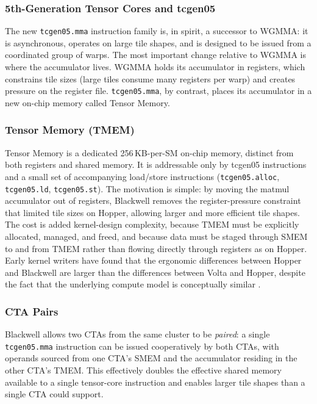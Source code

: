 \documentclass[10pt]{article}
\begin{document}
\subsubsection{5th-Generation Tensor Cores and tcgen05}
The new \texttt{tcgen05.mma} instruction family is, in spirit, a successor to WGMMA: it is asynchronous, operates on large tile shapes, and is designed to be issued from a coordinated group of warps. The most important change relative to WGMMA is where the accumulator lives. WGMMA holds its accumulator in registers, which constrains tile sizes (large tiles consume many registers per warp) and creates pressure on the register file. \texttt{tcgen05.mma}, by contrast, places its accumulator in a new on-chip memory called Tensor Memory.

\subsubsection{Tensor Memory (TMEM)}
Tensor Memory is a dedicated 256\,KB-per-SM on-chip memory, distinct from both registers and shared memory. It is addressable only by tcgen05 instructions and a small set of accompanying load/store instructions (\texttt{tcgen05.alloc}, \texttt{tcgen05.ld}, \texttt{tcgen05.st}). The motivation is simple: by moving the matmul accumulator out of registers, Blackwell removes the register-pressure constraint that limited tile sizes on Hopper, allowing larger and more efficient tile shapes. The cost is added kernel-design complexity, because TMEM must be explicitly allocated, managed, and freed, and because data must be staged through SMEM to and from TMEM rather than flowing directly through registers as on Hopper. Early kernel writers have found that the ergonomic differences between Hopper and Blackwell are larger than the differences between Volta and Hopper, despite the fact that the underlying compute model is conceptually similar \citep{veitner2025blackwell}.

\subsubsection{CTA Pairs}
Blackwell allows two CTAs from the same cluster to be \emph{paired}: a single \texttt{tcgen05.mma} instruction can be issued cooperatively by both CTAs, with operands sourced from one CTA's SMEM and the accumulator residing in the other CTA's TMEM. This effectively doubles the effective shared memory available to a single tensor-core instruction and enables larger tile shapes than a single CTA could support.
\end{document}
